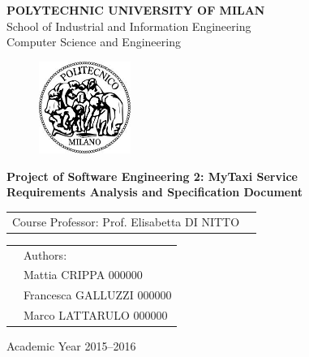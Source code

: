 \documentclass[a4paper, 12pt]{report}
\begin{document}
\begin{titlepage}

\begin{center}
\Large
\textbf{POLYTECHNIC UNIVERSITY OF MILAN} \\
\Large
School of Industrial and Information Engineering \\
Computer Science and Engineering
\end{center}

\addvspace{0.8cm}
\begin{figure}[h]
\begin{center}
\includegraphics[width=3cm]{cpt/img/polimi}
\end{center}
\end{figure}

\addvspace{0.1cm}
\begin{center}
\LARGE

\textbf{Project of Software Engineering 2: MyTaxi Service \\
Requirements Analysis and Specification Document}

\end{center}

\addvspace{0.5cm}
\Large
\begin{center}
\begin{tabular}{p{}p{}}
Course Professor: Prof. Elisabetta DI NITTO \\
\end{tabular}
\end{center}

\addvspace{0.6cm}
\Large
\begin{center}
\begin{tabular}{p{}p{}}
& Authors: \\
& Mattia 	CRIPPA		000000\\
& Francesca GALLUZZI	000000\\
& Marco 	LATTARULO	000000
\end{tabular}
\end{center}

\vfill
\Large
\begin{center}
Academic Year 2015--2016
\end{center}
\end{titlepage}

\clearpage

\tableofcontents
\clearpage

\listoffigures
\clearpage



\clearpage


\clearpage


\clearpage


\clearpage
\end{document}
